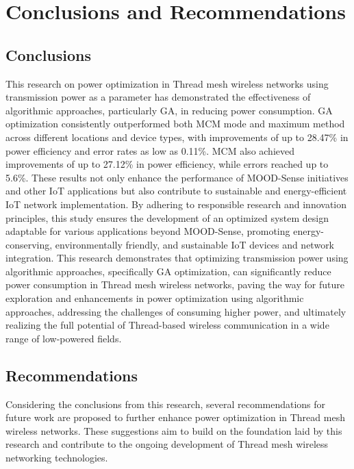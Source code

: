 \chapter{Conclusions and Recommendations}\label{cap:conclusions_recommendations}

\section{Conclusions}\label{sec:conclusions}
This research on power optimization in Thread mesh wireless networks using transmission power as a parameter has demonstrated the effectiveness of algorithmic approaches, particularly \acrlong{GA}, in reducing power consumption. \gls{GA} optimization consistently outperformed both \acrlong{MCM} mode and maximum method across different locations and device types, with improvements of up to 28.47\% in power efficiency and error rates as low as 0.11\%. \gls{MCM} also achieved improvements of up to 27.12\% in power efficiency, while errors reached up to 5.6\%. These results not only enhance the performance of MOOD-Sense initiatives and other \gls{IoT} applications but also contribute to sustainable and energy-efficient \gls{IoT} network implementation. By adhering to responsible research and innovation principles, this study ensures the development of an optimized system design adaptable for various applications beyond MOOD-Sense, promoting energy-conserving, environmentally friendly, and sustainable \gls{IoT} devices and network integration. This research demonstrates that optimizing transmission power using algorithmic approaches, specifically \gls{GA} optimization, can significantly reduce power consumption in Thread mesh wireless networks, paving the way for future exploration and enhancements in power optimization using algorithmic approaches, addressing the challenges of consuming higher power, and ultimately realizing the full potential of Thread-based wireless communication in a wide range of low-powered fields.


\section{Recommendations}\label{sec:recommendations}
Considering the conclusions from this research, several recommendations for future work are proposed to further enhance power optimization in Thread mesh wireless networks. These suggestions aim to build on the foundation laid by this research and contribute to the ongoing development of Thread mesh wireless networking technologies.

